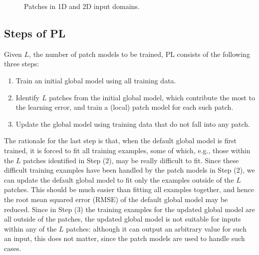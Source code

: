 \documentclass[journal,twocolumn]{IEEEtran}
\begin{document}
\begin{figure}[htbp]\centering
{}
\caption{Patches in 1D and 2D input domains.} \label{fig:patchs}
\end{figure}


\subsection{Steps of PL}

Given $L$, the number of patch models to be trained, PL consists of the following three steps:
\begin{enumerate}
\item Train an initial global model using all training data.
\item Identify $L$ patches from the initial global model, which contribute the most to the learning error, and train a (local) patch model for each such patch.
\item Update the global model using training data that do not fall into any patch.
\end{enumerate}
The rationale for the last step is that, when the default global model is first trained, it is forced to fit all training examples, some of which, e.g., those within the $L$ patches identified in Step (2), may be really difficult to fit. Since these difficult training examples have been handled by the patch models in Step (2), we can update the default global model to fit only the examples outside of the $L$ patches. This should be much easier than fitting all examples together, and hence the root mean squared error (RMSE) of the default global model may be reduced. Since in Step (3) the training examples for the updated global model are all outside of the patches, the updated global model is not suitable for inputs within any of the $L$ patches: although it can output an arbitrary value for such an input, this does not matter, since the patch models are used to handle such cases.
\end{document}
